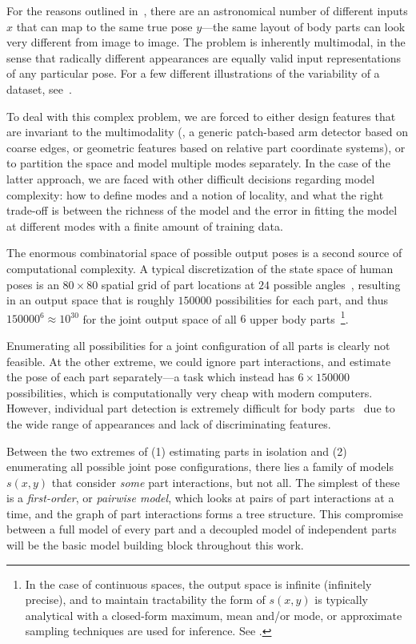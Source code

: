  For the reasons outlined 
in~, there are an astronomical number of different inputs 
$x$ that can map to the same true pose $y$---the same layout of body parts can 
look very different from image to image.  The problem is inherently multimodal, 
in the sense that radically different appearances are equally valid input 
representations of any particular pose.  For a few different illustrations of 
the variability of a dataset, see~. 

To deal with this complex problem, we are forced to either design features that 
are invariant to the multimodality (\eg, a generic patch-based arm detector 
based on coarse edges, or geometric features based on relative part coordinate 
systems), or to partition the space and model multiple modes separately.  In 
the case of the latter approach, we are faced with other difficult decisions 
regarding model complexity: how to define modes and a notion of locality, and 
what the right trade-off is between the richness of the model and the error in 
fitting the model at different modes with a finite amount of training data.

The enormous combinatorial space of possible output poses is a second source of 
computational complexity.  A typical discretization of the state space of human 
poses is an $80 \times 80$ spatial grid of part locations at $24$ possible 
angles~\citep{felz05}, resulting in an output space that is roughly $150000$ 
possibilities for each part, and thus $150000^6 \approx 10^{30}$ for the joint 
output space of all $6$ upper body parts~\footnote{In the case of continuous 
spaces, the output space is infinite (infinitely precise), and to maintain 
tractability the form of $s(x,y)$ is typically analytical with a closed-form 
maximum, mean and/or mode, or approximate sampling techniques are used for 
inference. See .}.

Enumerating all possibilities for a joint configuration of all parts is clearly 
not feasible.  At the other extreme, we could ignore part interactions, and 
estimate the pose of each part separately---a task which instead has $6 \times 
150000$ possibilities, which is computationally very cheap with modern 
computers.  However, individual part detection is extremely difficult for body 
parts~\citep{andriluka09} due to the wide range of appearances and lack of 
discriminating features.

Between the two extremes of (1) estimating parts in isolation and (2) 
enumerating all possible joint pose configurations, there lies a family of 
models $s(x,y)$ that consider {\em some} part interactions, but not all.  The 
simplest of these is a {\em first-order}, or {\em pairwise model}, which looks 
at pairs of part interactions at a time, and the graph of part interactions 
forms a tree structure.  This compromise between a full model of every part and 
a decoupled model of independent parts will be the basic model building block 
throughout this work.

